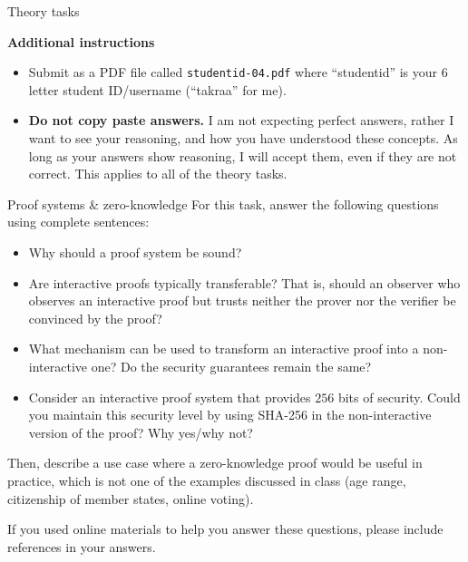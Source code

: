 \documentclass{homework}
\begin{document}
\newpage

\begin{center}
  Theory tasks
\end{center}

\textbf{Additional instructions}

\begin{itemize}
  \item Submit as a PDF file called \texttt{studentid-04.pdf} where \enquote{studentid} is your 6 letter student ID/username (\enquote{takraa} for me).
  \item \textbf{Do not copy paste answers.}
  I am not expecting perfect answers, rather I want to see your reasoning, and how you have understood these concepts.
  As long as your answers show reasoning, I will accept them, even if they are not correct.
  This applies to all of the theory tasks.
\end{itemize}

\begin{task}{Proof systems \& zero-knowledge}
  For this task, answer the following questions using complete sentences:
  \begin{itemize}
    \item Why should a proof system be sound?

    \item Are interactive proofs typically transferable?
    That is, should an observer who observes an interactive proof but trusts neither the prover nor the verifier be convinced by the proof?

    \item What mechanism can be used to transform an interactive proof into a non-interactive one?
    Do the security guarantees remain the same?

    \item Consider an interactive proof system that provides $256$ bits of security.
    Could you maintain this security level by using SHA-256 in the non-interactive version of the proof?
    Why yes/why not?
  \end{itemize}

  Then, describe a use case where a zero-knowledge proof would be useful in practice, which is not one of the examples discussed in class (age range, citizenship of member states, online voting).

  If you used online materials to help you answer these questions, please include references in your answers.
\end{task}
\end{document}
